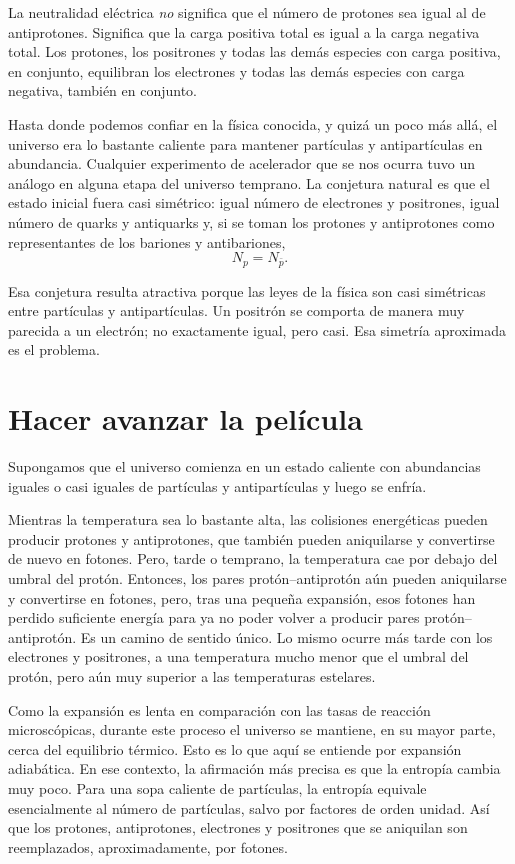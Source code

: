 La neutralidad eléctrica \emph{no} significa que el número de protones sea igual al de antiprotones. Significa que la carga positiva total es igual a la carga negativa total. Los protones, los positrones y todas las demás especies con carga positiva, en conjunto, equilibran los electrones y todas las demás especies con carga negativa, también en conjunto.

Hasta donde podemos confiar en la física conocida, y quizá un poco más allá, el universo era lo bastante caliente para mantener partículas y antipartículas en abundancia. Cualquier experimento de acelerador que se nos ocurra tuvo un análogo en alguna etapa del universo temprano. La conjetura natural es que el estado inicial fuera casi simétrico: igual número de electrones y positrones, igual número de quarks y antiquarks y, si se toman los protones y antiprotones como representantes de los bariones y antibariones,
\[
N_p = N_{\bar p}.
\]

Esa conjetura resulta atractiva porque las leyes de la física son casi simétricas entre partículas y antipartículas. Un positrón se comporta de manera muy parecida a un electrón; no exactamente igual, pero casi. Esa simetría aproximada es el problema.

\section{Hacer avanzar la película}

Supongamos que el universo comienza en un estado caliente con abundancias iguales o casi iguales de partículas y antipartículas y luego se enfría.

Mientras la temperatura sea lo bastante alta, las colisiones energéticas pueden producir protones y antiprotones, que también pueden aniquilarse y convertirse de nuevo en fotones. Pero, tarde o temprano, la temperatura cae por debajo del umbral del protón. Entonces, los pares protón--antiprotón aún pueden aniquilarse y convertirse en fotones, pero, tras una pequeña expansión, esos fotones han perdido suficiente energía para ya no poder volver a producir pares protón--antiprotón. Es un camino de sentido único. Lo mismo ocurre más tarde con los electrones y positrones, a una temperatura mucho menor que el umbral del protón, pero aún muy superior a las temperaturas estelares.

Como la expansión es lenta en comparación con las tasas de reacción microscópicas, durante este proceso el universo se mantiene, en su mayor parte, cerca del equilibrio térmico. Esto es lo que aquí se entiende por expansión adiabática. En ese contexto, la afirmación más precisa es que la entropía cambia muy poco. Para una sopa caliente de partículas, la entropía equivale esencialmente al número de partículas, salvo por factores de orden unidad. Así que los protones, antiprotones, electrones y positrones que se aniquilan son reemplazados, aproximadamente, por fotones.

